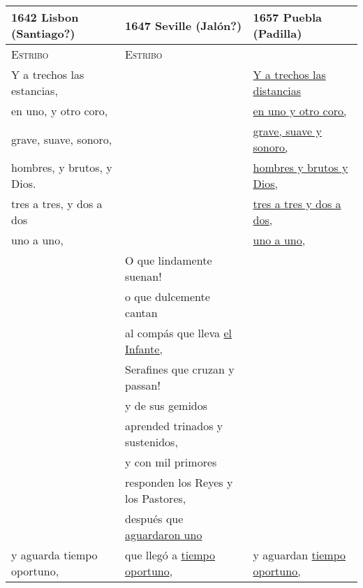 \documentclass[table]{vcbook-float}
\begin{document}
\begin{tabular}{lll}
    \toprule
    1642 Lisbon (Santiago?) & 
    1647 Seville (Jalón?) & 
    1657 Puebla (Padilla) \\
    \midrule 
 
    \textsc{Estribo} &
    \textsc{Estribo} &
    \\

    \strophe{} Y a trechos las estancias, &
    &
    \strophe{} \uline{Y a trechos las distancias} \\

    en uno, y otro coro, &
    &
    \uline{en uno y otro coro,} \\

    grave, suave, sonoro, &
    &
    \uline{grave, suave y sonoro,} \\

    hombres, y brutos, y Dios. &
    &
    \uline{hombres y brutos y Dios,} \\

    tres a tres, y dos a dos &
    &
    \uline{tres a tres y dos a dos,} \\

    uno a uno, &
    &
    \uline{uno a uno,} \\
    
    & 
    O que lindamente suenan! 
    & \\
    
    & 
    o que dulcemente cantan 
    & \\
    
    & 
    al compás que lleva \uline{el Infante,} 
    & \\
    
    & 
    Serafines que cruzan y passan! 
    & \\
    
    & 
    y de sus gemidos 
    & \\
    
    & 
    aprended trinados y sustenidos, 
    & \\
    
    & 
    y con mil primores 
    & \\ 
    
    & 
    responden los Reyes y los Pastores, 
    & \\
 
    & 
    después que \uline{aguardaron uno} 
    & \\

    y aguarda tiempo oportuno, &
    que llegó a \uline{tiempo oportuno}, &
    y aguardan \uline{tiempo oportuno,} \\ 
    

\end{tabular}
\end{document}
